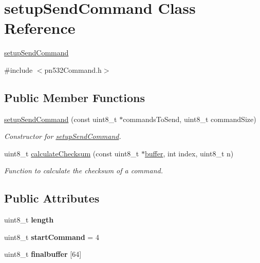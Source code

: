 \hypertarget{classsetupSendCommand}{}\section{setup\+Send\+Command Class Reference}
\label{classsetupSendCommand}


\hyperlink{classsetupSendCommand}{setup\+Send\+Command}  




{\ttfamily \#include $<$pn532\+Command.\+h$>$}

\subsection*{Public Member Functions}
\begin{DoxyCompactItemize}
\item 
\hyperlink{classsetupSendCommand_ab61ddb3490a81ce23199f38bf01c5474}{setup\+Send\+Command} (const uint8\+\_\+t $\ast$commands\+To\+Send, uint8\+\_\+t command\+Size)
\begin{DoxyCompactList}\small\item\em Constructor for \hyperlink{classsetupSendCommand}{setup\+Send\+Command}. \end{DoxyCompactList}\item 
uint8\+\_\+t \hyperlink{classsetupSendCommand_ac31e42b6848a7cee79b23924759753b9}{calculate\+Checksum} (const uint8\+\_\+t $\ast$\hyperlink{classbuffer}{buffer}, int index, uint8\+\_\+t n)
\begin{DoxyCompactList}\small\item\em Function to calculate the checksum of a command. \end{DoxyCompactList}\end{DoxyCompactItemize}
\subsection*{Public Attributes}
\begin{DoxyCompactItemize}
\item 
\mbox{\label{classsetupSendCommand_aeab654e713acac334513eb7c6b1df207}} 
uint8\+\_\+t {\bfseries length}
\item 
\mbox{\label{classsetupSendCommand_a8621e212594dd292d12ed8982290b155}} 
uint8\+\_\+t {\bfseries start\+Command} = 4
\item 
\mbox{\label{classsetupSendCommand_a905d7bb6c142fe21bbfb7f364c9193a6}} 
uint8\+\_\+t {\bfseries finalbuffer} \mbox{[}64\mbox{]}
\end{DoxyCompactItemize}


